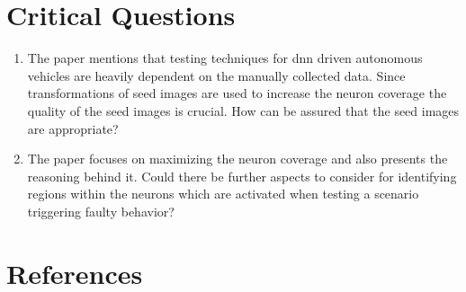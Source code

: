 \documentclass[oneside, notitlepage, twocolumn]{scrartcl}
\begin{document}
\section{Critical Questions}
\begin{enumerate}
    \item The paper mentions that testing techniques for \gls{dnn} driven autonomous vehicles are heavily dependent on the manually collected data.
        Since transformations of seed images are used to increase the neuron coverage the quality of the seed images is crucial.
        How can be assured that the seed images are appropriate?
    \item The paper focuses on maximizing the neuron coverage and also presents the reasoning behind it.
        Could there be further aspects to consider for identifying regions within the neurons which are activated when testing a scenario triggering faulty behavior?
\end{enumerate}

\section{References}
\begingroup
\renewcommand{\section}[2]{}%
\nocite{*}
\printbibliography%
\endgroup
\end{document}
